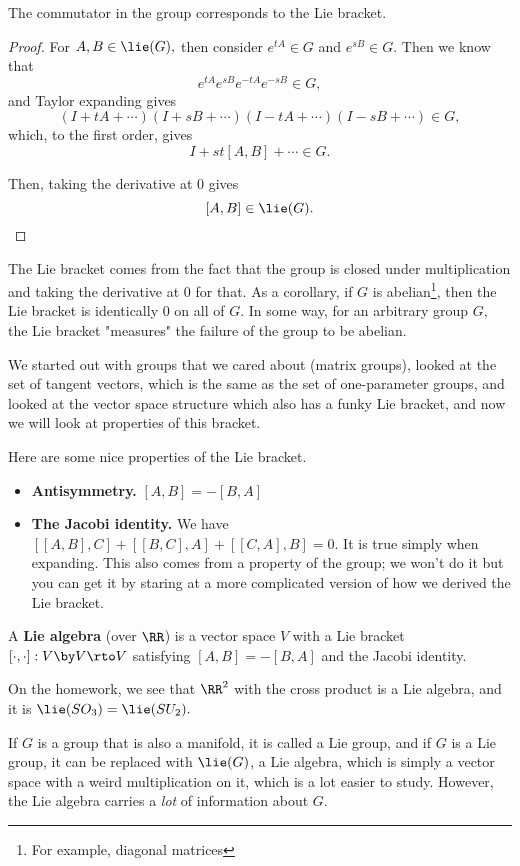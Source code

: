 The commutator in the group corresponds to the Lie bracket. %
\begin{proof}
For $A, B \in \lie(G),$ then consider $e^{tA} \in G$ and $e^{sB} \in G.$ Then we know that 
\[
e^{tA} e^{sB} e^{-tA}e^{-sB} \in G,
\]
and Taylor expanding gives
\[
(I + tA + \cdots)(I + sB + \cdots)(I -tA + \cdots)(I - sB + \cdots) \in G,
\]
which, to the first order, gives 
\[
I + st[A, B] + \cdots \in G.
\]

Then, taking the derivative at $0$ gives 
\[
[A, B] \in \lie(G).
\]%
\end{proof}

The Lie bracket comes from the fact that the group is closed under multiplication and taking the derivative at 0 for that. As a corollary, if $G$ is abelian\footnote{For example, diagonal matrices}, then the Lie bracket is identically 0 on all of $G.$ In some way, for an arbitrary group $G,$ the Lie bracket "measures" the failure of the group to be abelian. 

We started out with groups that we cared about (matrix groups), looked at the set of tangent vectors, which is the same as the set of one-parameter groups, and looked at the vector space structure which also has a funky Lie bracket, and now we will look at properties of this bracket.

Here are some nice properties of the Lie bracket.
\begin{itemize}
    \item \textbf{Antisymmetry.} $[A, B] = -[B, A]$
    \item \textbf{The Jacobi identity.} We have $[[A, B], C] + [[B, C], A] + [[C, A], B] = 0.$ It is true simply when expanding. This also comes from a property of the group; we won't do it but you can get it by staring at a more complicated version of how we derived the Lie bracket. %
\end{itemize}

\begin{definition}
A \textbf{Lie algebra} (over $\RR$) is a vector space $V$ with a Lie bracket $[\cdot, \cdot]: V \by V \rto V$ satisfying $[A, B] = -[B, A]$ and the Jacobi identity.
\end{definition}

On the homework, we see that $\RR^2$ with the cross product is a Lie algebra, and it is $\lie(SO_3) = \lie(SU_2).$

If $G$ is a group that is also a manifold, it is called a Lie group, and if $G$ is a Lie group, it can be replaced with $\lie(G)$, a Lie algebra, which is simply a vector space with a weird multiplication on it, which is a lot easier to study. However, the Lie algebra carries a \emph{lot} of information about $G.$ 

